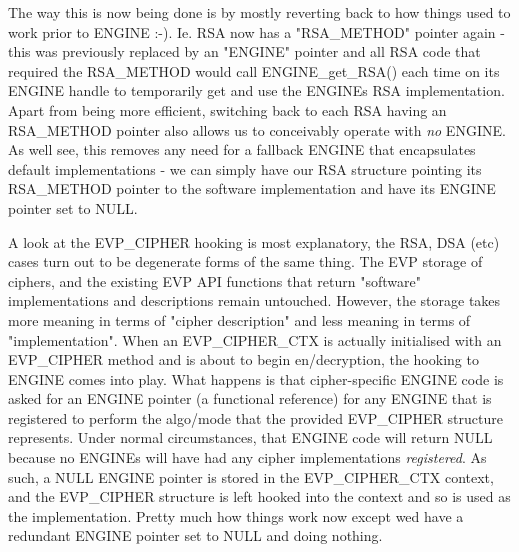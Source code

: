 The way this is now being done is by mostly reverting back to how things used to work prior to ENGINE \+:-\/). Ie. RSA now has a "{}\+RSA\+\_\+\+METHOD"{} pointer again -\/ this was previously replaced by an "{}\+ENGINE"{} pointer and all RSA code that required the RSA\+\_\+\+METHOD would call ENGINE\+\_\+get\+\_\+\+RSA() each time on its ENGINE handle to temporarily get and use the ENGINE\textquotesingle{}s RSA implementation. Apart from being more efficient, switching back to each RSA having an RSA\+\_\+\+METHOD pointer also allows us to conceivably operate with {\itshape no} ENGINE. As we\textquotesingle{}ll see, this removes any need for a fallback ENGINE that encapsulates default implementations -\/ we can simply have our RSA structure pointing its RSA\+\_\+\+METHOD pointer to the software implementation and have its ENGINE pointer set to NULL.

A look at the EVP\+\_\+\+CIPHER hooking is most explanatory, the RSA, DSA (etc) cases turn out to be degenerate forms of the same thing. The EVP storage of ciphers, and the existing EVP API functions that return "{}software"{} implementations and descriptions remain untouched. However, the storage takes more meaning in terms of "{}cipher description"{} and less meaning in terms of "{}implementation"{}. When an EVP\+\_\+\+CIPHER\+\_\+\+CTX is actually initialised with an EVP\+\_\+\+CIPHER method and is about to begin en/decryption, the hooking to ENGINE comes into play. What happens is that cipher-\/specific ENGINE code is asked for an ENGINE pointer (a functional reference) for any ENGINE that is registered to perform the algo/mode that the provided EVP\+\_\+\+CIPHER structure represents. Under normal circumstances, that ENGINE code will return NULL because no ENGINEs will have had any cipher implementations {\itshape registered}. As such, a NULL ENGINE pointer is stored in the EVP\+\_\+\+CIPHER\+\_\+\+CTX context, and the EVP\+\_\+\+CIPHER structure is left hooked into the context and so is used as the implementation. Pretty much how things work now except we\textquotesingle{}d have a redundant ENGINE pointer set to NULL and doing nothing.

